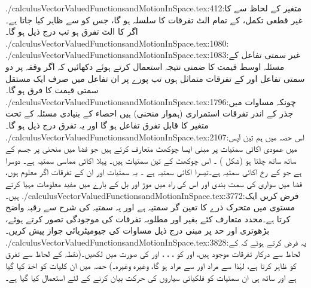 ./calculusVectorValuedFunctionsandMotionInSpace.tex:412:متغیر  کے لحاظ سے  کا غیر قطعی تکمل،  کے تمام الٹ تفرقات کا سلسلہ ہو گا، جس کو  سے ظاہر کیا جاتا ہے۔ اگر  کا الٹ تفرق  ہو تب درج ذیل ہو گا۔
./calculusVectorValuedFunctionsandMotionInSpace.tex:1080:\\
./calculusVectorValuedFunctionsandMotionInSpace.tex:1083:غیر سمتی تفاعل کے مسئلہ اوسط قیمت کا ضمنی نتیجہ   استعمال کرتے ہوئے  دکھائیں کہ اگر  وقفہ  پر دو سمتی تفاعل  اور   کے تفرقات  متماثل  ہوں  تب پورے   پر ان تفاعل میں صرف ایک مستقل  سمتی قیمت کا فرق ہو گا۔
./calculusVectorValuedFunctionsandMotionInSpace.tex:1796:چونکہ مساوات  میں جذر کے اندر تفرقات  استمراری   (ہموار منحنی)  ہیں احصاء کے بنیادی مسئلہ کے تحت  متغیر  کا قابل تفرق تفاعل ہو گا     اور یہ تفرق درج ذیل ہو گا۔
./calculusVectorValuedFunctionsandMotionInSpace.tex:2107:اس حصہ میں ہم   تین آپس میں عمودی اکائی سمتیات پر مبنی ایسا چوکھٹ متعارف کرتے ہیں جو  فضا میں منحنی پر جسم کے ساتھ ساتھ چلتا ہو (شکل ) ۔ اس چوکھٹ کے تین سمتیات  ہیں۔ پہلا  اکائی مماسی سمتیہ  ہے۔ دوسرا  ہے جو   کے رخ اکائی سمتیہ ہے۔تیسرا اکائی سمتیہ   ہے ۔ یہ سمتیات اور ان کے تفرقات  اگر معلوم ہوں، فضا  میں سواری  کی  سمت بندی اور اس کی راہ  میں موڑ  اور بل  کے بارے میں مفید معلومات   مہیا کرتے ہیں۔
./calculusVectorValuedFunctionsandMotionInSpace.tex:3772:فرض کریں  ایک مستوی میں متحرک ذرے کا تعین گر سمتیہ  ہے اور  یہ  سمتیہ  کی شرح سے رقبہ واضح کرتا ہے۔محدد متعارف کئے بغیر اور مطلوبہ تفرقات  کی موجودگی تصور کرتے ہوئے، بڑھوتری اور حد  پر مبنی  درج ذیل مساوات کی  جیومیٹریائی جواز پیش کریں۔ 
./calculusVectorValuedFunctionsandMotionInSpace.tex:3828:یہ فرض کرتے ہوئے  کہ  کے لحاظ سے درکار تفرقات موجود ہیں،  اور  کو ، ، ،  اور  کی صورت میں لکھیں۔(نقطہ  کے لحاظ سے تفرق کو ظاہر کرتا ہے، لہٰذا  سے مراد  اور  سے مراد  ہو گا، وغیرہ وغیرہ۔)  حصہ  میں ان کلیات کو اخذ کیا گیا ہے  اور ساتھ ہی ان سمتیات کو فلکیاتی سیاروں کی حرکت بیان کرنے کے لئے استعمال کیا گیا ہے۔

